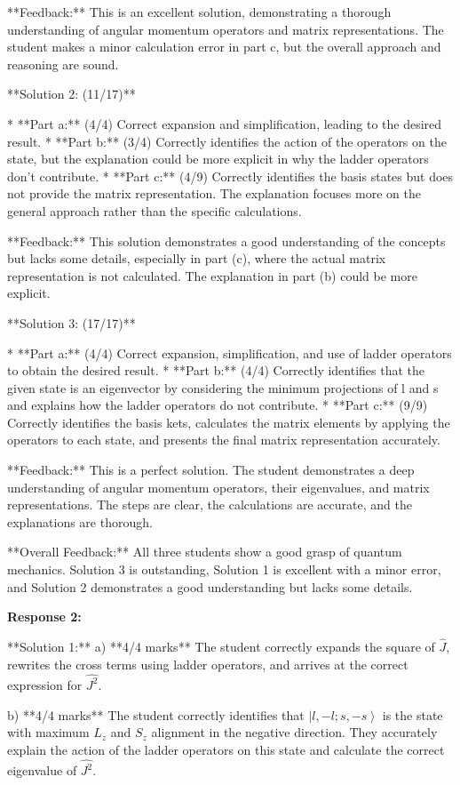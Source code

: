 \documentclass[a4paper,11pt]{article}
\begin{document}
**Feedback:** This is an excellent solution, demonstrating a thorough understanding of angular momentum operators and matrix representations. The student makes a minor calculation error in part c, but the overall approach and reasoning are sound.

**Solution 2: (11/17)**

*   **Part a:** (4/4) Correct expansion and simplification, leading to the desired result.
*   **Part b:** (3/4) Correctly identifies the action of the operators on the state, but the explanation could be more explicit in why the ladder operators don't contribute.
*   **Part c:** (4/9) Correctly identifies the basis states but does not provide the matrix representation. The explanation focuses more on the general approach rather than the specific calculations.

**Feedback:** This solution demonstrates a good understanding of the concepts but lacks some details, especially in part (c), where the actual matrix representation is not calculated. The explanation in part (b) could be more explicit.

**Solution 3: (17/17)**

*   **Part a:** (4/4) Correct expansion, simplification, and use of ladder operators to obtain the desired result.
*   **Part b:** (4/4) Correctly identifies that the given state is an eigenvector by considering the minimum projections of l and s and explains how the ladder operators do not contribute.
*   **Part c:** (9/9) Correctly identifies the basis kets, calculates the matrix elements by applying the operators to each state, and presents the final matrix representation accurately.

**Feedback:** This is a perfect solution. The student demonstrates a deep understanding of angular momentum operators, their eigenvalues, and matrix representations. The steps are clear, the calculations are accurate, and the explanations are thorough.

**Overall Feedback:** All three students show a good grasp of quantum mechanics. Solution 3 is outstanding, Solution 1 is excellent with a minor error, and Solution 2 demonstrates a good understanding but lacks some details.

\textbf{Response 2:}

**Solution 1:**
a) **4/4 marks**
The student correctly expands the square of \(\hat{J}\), rewrites the cross terms using ladder operators, and arrives at the correct expression for \(\hat{J^2}\).

b) **4/4 marks**
The student correctly identifies that \(\left|l, -l; s, -s \right>\) is the state with maximum \(L_z\) and \(S_z\) alignment in the negative direction. They accurately explain the action of the ladder operators on this state and calculate the correct eigenvalue of \(\hat{J^2}\).
\end{document}
